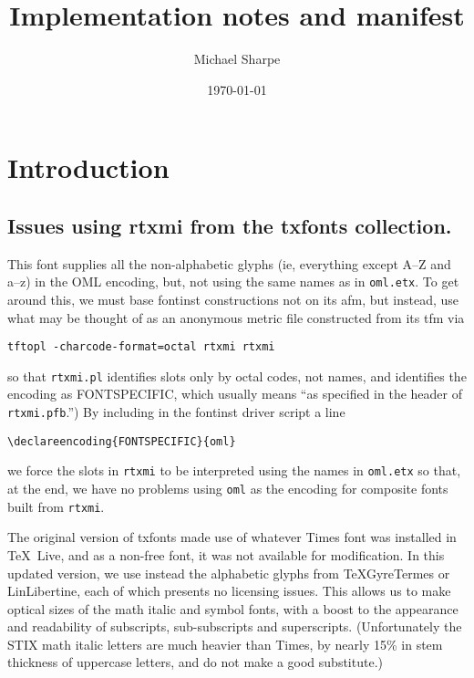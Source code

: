 \documentclass[10pt]{amsart}
\title{Implementation notes and manifest}
\author{Michael Sharpe}
\date{\today}
\begin{document}
\maketitle
\section{Introduction}
\subsection{Issues using \textsf{rtxmi} from the \textsf{txfonts} collection.} This font supplies all the non-alphabetic glyphs (ie, everything except A--Z and a--z) in the \textsf{OML} encoding, but, not using the same names as in {\tt oml.etx}. To get around this, we must base \textsf{fontinst} constructions not on its \textsf{afm}, but instead, use what may be thought of as an anonymous metric file constructed from its \textsf{tfm} via
\begin{verbatim}
tftopl -charcode-format=octal rtxmi rtxmi
\end{verbatim}
so that {\tt rtxmi.pl} identifies slots only by octal codes, not names, and identifies the encoding as \textsf{FONTSPECIFIC}, which usually means ``as specified in the header of {\tt rtxmi.pfb}.'') By including in the \textsf{fontinst} driver script a line
\begin{verbatim}
\declareencoding{FONTSPECIFIC}{oml}
\end{verbatim}
we force the slots in {\tt rtxmi} to be interpreted using the names in {\tt oml.etx} so that, at the end, we have no problems using {\tt oml} as the encoding for composite fonts built from {\tt rtxmi}.


The original version of \textsf{txfonts} made use of whatever Times font was installed in \TeX\ Live, and as a non-free font, it was not available for modification. In this updated version, we use instead the alphabetic glyphs from  TeXGyreTermes or LinLibertine, each of which presents no licensing issues. This allows us to make optical sizes of the math italic and symbol fonts, with a  boost to the appearance and readability of subscripts, sub-subscripts and superscripts. (Unfortunately the STIX math italic letters are much heavier than Times, by nearly 15\% in stem thickness of uppercase letters, and do not make a good substitute.)  
\end{document}
